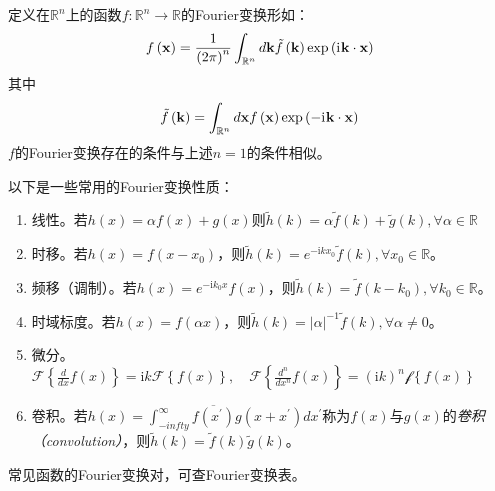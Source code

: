\documentclass[main.tex]{subfiles}
\begin{document}
定义在$\mathbb{R}^n$上的函数$f:\mathbb{R}^n\rightarrow\mathbb{R}$的Fourier变换形如：
\begin{equation}\label{eq:fourier_transform_2}
    f\left(\mathbf{x}\right)=\frac{1}{\left(2\pi\right)^n}\int_{\mathbb{R}^n}d\mathbf{k}\tilde{f}\left(\mathbf{k}\right)\exp\left(\mathrm{i}\mkern1mu \mathbf{k}\cdot\mathbf{x}\right)
\end{equation}
其中
\[\tilde{f}\left(\mathbf{k}\right)=\int_{\mathbb{R}^n}d\mathbf{x}f\left(\mathbf{x}\right)\exp\left(-\mathrm{i}\mkern1mu\mathbf{k}\cdot\mathbf{x}\right)\]
$f$的Fourier变换存在的条件与上述$n=1$的条件相似。

以下是一些常用的Fourier变换性质：
\begin{enumerate}
    \item 线性。若$h\left(x\right)=\alpha f\left(x\right)+g\left(x\right)$则$\tilde{h}\left(k\right)=\alpha\tilde{f}\left(k\right)+\tilde{g}\left(k\right),\forall \alpha\in\mathbb{R}$
    \item 时移。若$h\left(x\right)=f\left(x-x_0\right)$，则$\tilde{h}\left(k\right)=e^{-\mathrm{i}kx_0}\tilde{f}\left(k\right),\forall x_0\in\mathbb{R}$。
    \item 频移（调制）。若$h\left(x\right)=e^{-\mathrm{i}k_0x}f\left(x\right)$，则$\tilde{h}\left(k\right)=\tilde{f}\left(k-k_0\right),\forall k_0\in\mathbb{R}$。
    \item 时域标度。若$h\left(x\right)=f\left(\alpha x\right)$，则$\tilde{h}\left(k\right)=\left|\alpha\right|^{-1}\tilde{f}\left(k\right),\forall \alpha\neq 0$。
    \item 微分。$\mathcal{F}\left\{\frac{d}{dx}f\left(x\right)\right\}=\mathrm{i}k\mathcal{F}\left\{f\left(x\right)\right\},\quad\mathcal{F}\left\{\frac{d^n}{dx^n}f\left(x\right)\right\}=\left(\mathrm{i}k\right)^n\mathcal{f}\left\{f\left(x\right)\right\}$
    \item 卷积。若$h\left(x\right)=\int_{-infty}^\infty\overline{f\left(x^\prime\right)}g\left(x+x^\prime\right)dx^\prime$称为$f\left(x\right)$与$g\left(x\right)$的\emph{卷积（convolution）}，则$\tilde{h}\left(k\right)=\tilde{f}\left(k\right)\tilde{g}\left(k\right)$。
\end{enumerate}

常见函数的Fourier变换对，可查Fourier变换表。

\end{document}
